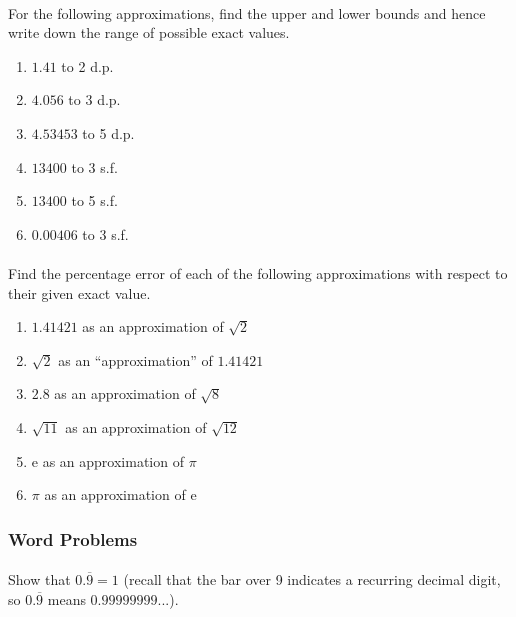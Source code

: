 \documentclass[12pt, a4paper, titlepage, twoside]{article}
\newcommand*{\e}{\textrm{e}}
\begin{document}
	\paragraph{}
	 For the following approximations, find the upper and lower bounds and hence write down the
	range of possible exact values.
	
	\begin{multicols}{2}
		\begin{enumerate}[label=\textbf{(\alph*)}]
			\item $1.41$ to 2 d.p.
			\item $4.056$ to 3 d.p.
			\item $4.53453$ to 5 d.p.
			\item $13400$ to 3 s.f.
			\item $13400$ to 5 s.f.
			\item $0.00406$ to 3 s.f.
		\end{enumerate}
	\end{multicols}
	
	\paragraph{}
	 Find the percentage error of each of the following approximations with respect to their given exact value.
	
	\begin{multicols}{2}
		\begin{enumerate}[label=\textbf{(\alph*)}]
			\item $1.41421$ as an approximation of $\sqrt{2}$
			\item $\sqrt{2}$ as an ``approximation'' of $1.41421$
			\item $2.8$ as an approximation of $\sqrt{8}$
			\item $\sqrt{11}$ as an approximation of $\sqrt{12}$
			\item $\e$ as an approximation of $\pi$
			\item $\pi$ as an approximation of $\e$
		\end{enumerate}
	\end{multicols}
	
	\subsubsection*{Word Problems}
	
	\paragraph{}
	 Show that $0.\overline{9}= 1$ (recall that the bar over 9 indicates a recurring decimal digit, so
	$0.\overline{9}$ means $0.99999999...$).
	
\end{document}
